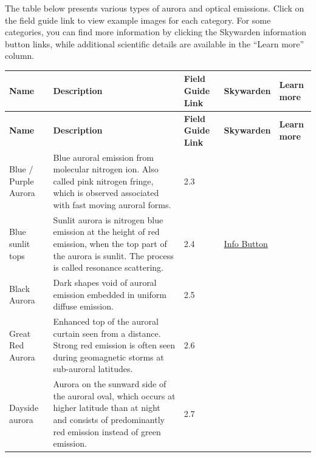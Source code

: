 \documentclass{article}
\begin{document}
The table below presents various types of aurora and optical emissions. Click on the field guide link to view example images for each category. For some categories, you can find more information by clicking the Skywarden information button links, while additional scientific details are available in the ``Learn more'' column.


\begin{longtable}{|p{1.5cm}|p{6.5cm}|p{1cm}|p{1.75cm}|p{1.8cm}|}
\hline
\textbf{Name} & \textbf{Description} & \textbf{Field Guide Link} & \textbf{Skywarden} & \textbf{Learn more} \\
\hline
\endfirsthead
\hline
\textbf{Name} & \textbf{Description} & \textbf{Field Guide Link} & \textbf{Skywarden} & \textbf{Learn more} \\
\hline
\endhead
\hline
\endfoot
\hline
\endlastfoot

Blue / Purple Aurora & Blue auroral emission from molecular nitrogen ion. Also called pink nitrogen fringe, which is observed associated with fast moving auroral forms. & 2.3 &  &  \\
\hline
Blue sunlit tops & Sunlit aurora is nitrogen blue emission at the height of red emission, when the top part of the aurora is sunlit. The process is called resonance scattering. & 2.4 & \href{https://www.taivaanvahti.fi/observations/info/428/en}{Info Button} & \textcite{Shiokawa2019} \\
\hline
Black Aurora & Dark shapes void of auroral emission embedded in uniform diffuse emission. & 2.5 &  & \textcite{Trondsen1997} \\
\hline
Great Red Aurora & Enhanced top of the auroral curtain seen from a distance. Strong red emission is often seen during geomagnetic storms at sub-auroral latitudes. & 2.6 &  &  \\
\hline
Dayside aurora & Aurora on the sunward side of the auroral oval, which occurs at higher latitude than at night and consists of predominantly red emission instead of green emission. & 2.7 &  & \textcite{Frey2019} \\
\hline


\end{longtable}
\end{document}
